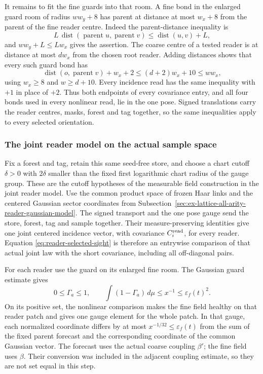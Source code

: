 It remains to fit the fine guards into that room. A fine bond in
the enlarged guard room of radius $ww_y+8$ has parent at distance
at most $w_x+8$ from the parent of the fine reader centre.
Indeed the parent-distance inequality is
\[
 L\,\operatorname{dist}(\operatorname{parent}u,
                         \operatorname{parent}v)
 \le\operatorname{dist}(u,v)+L,
\]
and $ww_y+L\le Lw_x$ gives the assertion. The coarse centre
of a tested reader is at distance at most $dw_x$ from the
chosen root reader. Adding distances shows that every such guard
bond has
\[
 \operatorname{dist}(o,\operatorname{parent}v)+w_x+2
 \le(d+2)w_x+10\le ww_x,
\]
using $w_x\ge8$ and $w\ge d+10$. Every incidence read has
the same inequality with $+1$ in place of $+2$. Thus both
endpoints of every covariance entry, and all four bonds used in
every nonlinear read, lie in the one pose. Signed translations
carry the reader centres, masks, forest and tag together, so the
same inequalities apply to every selected orientation.

\subsubsection{The joint reader model on the actual sample space}

Fix a forest and tag, retain this same seed-free store, and choose
a chart cutoff $\delta>0$ with $2\delta$ smaller than the fixed
first logarithmic chart radius of the gauge group. These are the
cutoff hypotheses of the measurable field construction in the
joint reader model. Use the common product space of frozen Haar
links and the centered Gaussian sector coordinates from
Subsection~\ref{sec:ex-lattice-all-arity-reader-gaussian-model}.
The signed transport and the one pose gauge send the store,
forest, tag and sample together. Their measure-preserving
identities give one joint centered incidence vector, with
covariance $C_i^{\rm read}$, for every reader. Equation
\eqref{eq:reader-selected-sight} is therefore an entrywise
comparison of that actual joint law with the short covariance,
including all off-diagonal pairs.

For each reader use the guard on its enlarged fine room. The
Gaussian guard estimate gives
\[
 0\le\Gamma_a\le1,\qquad
 \int(1-\Gamma_a)\,d\mu\le x^{-1}
                          \le\varepsilon_f(t)^2.
\]
On its positive set, the nonlinear comparison makes the fine
field healthy on that reader patch and gives one gauge element
for the whole patch. In that gauge, each normalized coordinate
differs by at most $x^{-1/32}\le\varepsilon_f(t)$ from the
sum of the fixed parent forecast and the corresponding coordinate
of the common Gaussian vector. The forecast uses the actual
coarse coupling $\beta'$; the fine field uses $\beta$. Their
conversion was included in the adjacent coupling estimate, so
they are not set equal in this step.

